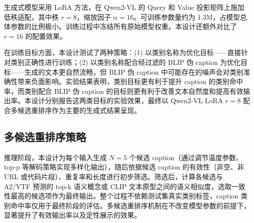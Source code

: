 生成式模型采用 LoRA 方法，在 Qwen2-VL 的 Query 和 Value 投影矩阵上施加低秩适配，其中秩 $r=8$，缩放因子 $\alpha=16$。可训练参数量约为 1.3M，占模型总体参数的比例极小。训练过程中冻结所有原始模型权重。本设计还额外对比了 $r=16$ 的配置效果。

在训练目标方面，本设计测试了两种策略：(1) 以类别名称为优化目标——直接针对类别正确性进行训练；(2) 以类别名称配合经过滤的 BLIP 伪 caption 为优化目标——生成的文本更自然流畅，但 BLIP 伪 caption 中可能存在的噪声会对类别准确性带来负面影响。实验结果表明，类别目标更有利于提升 caption 的类别命中率，而类别配合 BLIP 伪 caption 的目标则更有利于改善文本自然度和提高有效输出率。本设计分别报告这两类目标的实验效果，最终以 Qwen2-VL LoRA $r=8$ 配合多候选重排序作为主要的生成式结果呈现。

\subsection{多候选重排序策略}

推理阶段，本设计为每个输入生成 $N=5$ 个候选 caption（通过调节温度参数、top-p 等解码策略实现多样化输出），随后依据候选 caption 的有效性（非空、非 URL 或代码片段）、重复率和长度进行初步筛选。筛选后，计算各候选与 A2/VTF 预测的 top-k 语义概念或 CLIP 文本原型之间的语义相似度，选取一致性最高的候选项作为最终输出。整个过程不依赖测试集真实类别标签，caption 类别命中率仅用于最终阶段的评估。多候选重排序机制在不改变模型参数的前提下，显著提升了有效输出率以及定性展示的效果。

